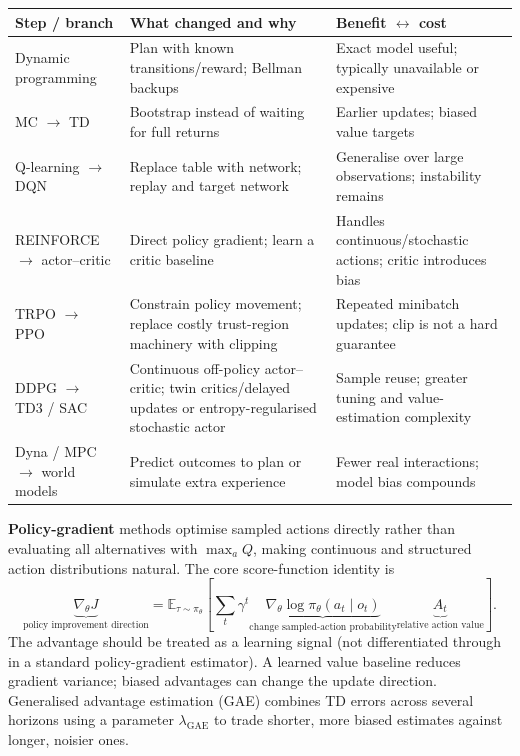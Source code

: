 \begin{center}\begingroup\footnotesize\setlength{\tabcolsep}{3pt}
\begin{tabular}{|p{.22\linewidth}|p{.35\linewidth}|p{.34\linewidth}|}\hline
\textbf{Step / branch} & \textbf{What changed and why} & \textbf{Benefit $\leftrightarrow$ cost}\\ \hline
Dynamic programming & Plan with known transitions/reward; Bellman backups & Exact model useful; typically unavailable or expensive\\ \hline
MC $\rightarrow$ TD & Bootstrap instead of waiting for full returns & Earlier updates; biased value targets\\ \hline
Q-learning $\rightarrow$ DQN & Replace table with network; replay and target network & Generalise over large observations; instability remains\\ \hline
REINFORCE $\rightarrow$ actor--critic & Direct policy gradient; learn a critic baseline & Handles continuous/stochastic actions; critic introduces bias\\ \hline
TRPO $\rightarrow$ PPO & Constrain policy movement; replace costly trust-region machinery with clipping & Repeated minibatch updates; clip is not a hard guarantee\\ \hline
DDPG $\rightarrow$ TD3 / SAC & Continuous off-policy actor--critic; twin critics/delayed updates or entropy-regularised stochastic actor & Sample reuse; greater tuning and value-estimation complexity\\ \hline
Dyna / MPC $\rightarrow$ world models & Predict outcomes to plan or simulate extra experience & Fewer real interactions; model bias compounds\\ \hline
\end{tabular}\endgroup\end{center}
\textbf{Policy-gradient} methods optimise sampled actions directly rather than evaluating all alternatives with $\max_aQ$, making continuous and structured action distributions natural.
The core score-function identity is
\[
\underbrace{\nabla_{\theta}J}_{\text{policy improvement direction}}
=\mathbb E_{\tau\sim\pi_{\theta}}\!\left[\sum_t\gamma^t
\underbrace{\nabla_{\theta}\log\pi_{\theta}(a_t\mid o_t)}_{\text{change sampled-action probability}}
\underbrace{A_t}_{\text{relative action value}}\right].
\]
The advantage should be treated as a learning signal (not differentiated through in a standard policy-gradient estimator).
A learned value baseline reduces gradient variance; biased advantages can change the update direction.
Generalised advantage estimation (GAE) combines TD errors across several horizons using a parameter $\lambda_{\mathrm{GAE}}$ to trade shorter, more biased estimates against longer, noisier ones.

